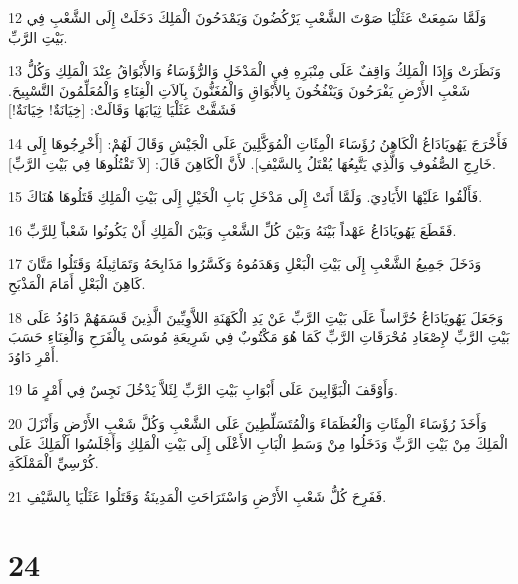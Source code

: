 \par 12 وَلَمَّا سَمِعَتْ عَثَلْيَا صَوْتَ الشَّعْبِ يَرْكُضُونَ وَيَمْدَحُونَ الْمَلِكَ دَخَلَتْ إِلَى الشَّعْبِ فِي بَيْتِ الرَّبِّ.
\par 13 وَنَظَرَتْ وَإِذَا الْمَلِكُ وَاقِفٌ عَلَى مِنْبَرِهِ فِي الْمَدْخَلِ وَالرُّؤَسَاءُ وَالأَبْوَاقُ عِنْدَ الْمَلِكِ وَكُلُّ شَعْبِ الأَرْضِ يَفْرَحُونَ وَيَنْفُخُونَ بِالأَبْوَاقِ وَالْمُغَنُّونَ بِآلاَتِ الْغِنَاءِ وَالْمُعَلِّمُونَ التَّسْبِيحَ. فَشَقَّتْ عَثَلْيَا ثِيَابَهَا وَقَالَتْ: [خِيَانَةٌ! خِيَانَةٌ!]
\par 14 فَأَخْرَجَ يَهُويَادَاعُ الْكَاهِنُ رُؤَسَاءَ الْمِئَاتِ الْمُوَكَّلِينَ عَلَى الْجَيْشِ وَقَالَ لَهُمْ: [أَخْرِجُوهَا إِلَى خَارِجِ الصُّفُوفِ وَالَّذِي يَتَّبِعُهَا يُقْتَلُ بِالسَّيْفِ]. لأَنَّ الْكَاهِنَ قَالَ: [لاَ تَقْتُلُوهَا فِي بَيْتِ الرَّبِّ].
\par 15 فَأَلْقُوا عَلَيْهَا الأَيَادِيَ. وَلَمَّا أَتَتْ إِلَى مَدْخَلِ بَابِ الْخَيْلِ إِلَى بَيْتِ الْمَلِكِ قَتَلُوهَا هُنَاكَ.
\par 16 فَقَطَعَ يَهُويَادَاعُ عَهْداً بَيْنَهُ وَبَيْنَ كُلِّ الشَّعْبِ وَبَيْنَ الْمَلِكِ أَنْ يَكُونُوا شَعْباً لِلرَّبِّ.
\par 17 وَدَخَلَ جَمِيعُ الشَّعْبِ إِلَى بَيْتِ الْبَعْلِ وَهَدَمُوهُ وَكَسَّرُوا مَذَابِحَهُ وَتَمَاثِيلَهُ وَقَتَلُوا مَتَّانَ كَاهِنَ الْبَعْلِ أَمَامَ الْمَذْبَحِ.
\par 18 وَجَعَلَ يَهُويَادَاعُ حُرَّاساً عَلَى بَيْتِ الرَّبِّ عَنْ يَدِ الْكَهَنَةِ اللاَّوِيِّينَ الَّذِينَ قَسَمَهُمْ دَاوُدُ عَلَى بَيْتِ الرَّبِّ لإِصْعَادِ مُحْرَقَاتِ الرَّبِّ كَمَا هُوَ مَكْتُوبٌ فِي شَرِيعَةِ مُوسَى بِالْفَرَحِ وَالْغِنَاءِ حَسَبَ أَمْرِ دَاوُدَ.
\par 19 وَأَوْقَفَ الْبَوَّابِينَ عَلَى أَبْوَابِ بَيْتِ الرَّبِّ لِئَلاَّ يَدْخُلَ نَجِسٌ فِي أَمْرٍ مَا.
\par 20 وَأَخَذَ رُؤَسَاءَ الْمِئَاتِ وَالْعُظَمَاءَ وَالْمُتَسَلِّطِينَ عَلَى الشَّعْبِ وَكُلَّ شَعْبِ الأَرْضِ وَأَنْزَلَ الْمَلِكَ مِنْ بَيْتِ الرَّبِّ وَدَخَلُوا مِنْ وَسَطِ الْبَابِ الأَعْلَى إِلَى بَيْتِ الْمَلِكِ وَأَجْلَسُوا الْمَلِكَ عَلَى كُرْسِيِّ الْمَمْلَكَةِ.
\par 21 فَفَرِحَ كُلُّ شَعْبِ الأَرْضِ وَاسْتَرَاحَتِ الْمَدِينَةُ وَقَتَلُوا عَثَلْيَا بِالسَّيْفِ.

\chapter{24}

